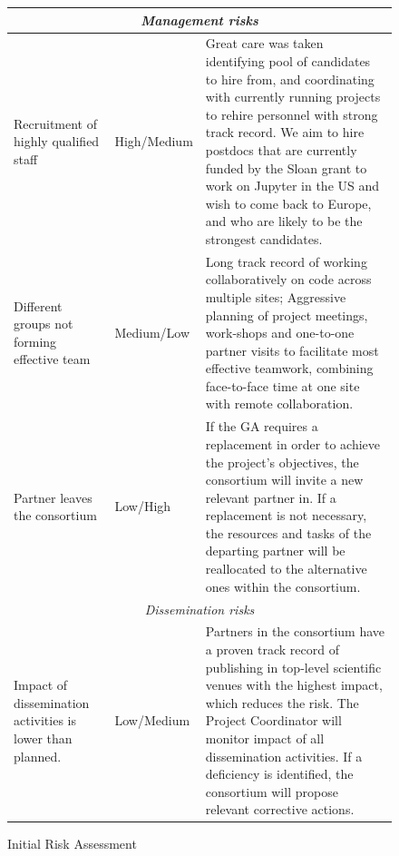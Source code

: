 \begin{figure}
\begin{center}
\begin{tabular}{|m{}|m{}|m{}|}
  \multicolumn{3}{|c|}{
    \textit{Management risks}
  }
  \\\hline

  Recruitment of highly qualified staff & High/Medium &
  Great care was taken identifying pool of candidates to hire from,
  and coordinating with currently running projects to rehire personnel
  with strong track record. We aim to hire
  postdocs that are currently funded by the Sloan grant to work on
  Jupyter in the US and wish to come back to Europe, and who are
  likely to be the strongest candidates.\\\hline

  Different groups not forming effective team & Medium/Low & Long
  track record of working collaboratively on code across multiple
  sites; Aggressive planning of project meetings, work-shops and
  one-to-one partner visits to facilitate most effective teamwork,
  combining face-to-face time at one site with remote
  collaboration.\\\hline

  Partner leaves the consortium & Low/High & If the GA requires a replacement
  in order to achieve the project's objectives, the consortium will invite a new
  relevant partner in. If a replacement is not necessary, the resources and tasks
  of the departing partner will be reallocated to the alternative ones within the
  consortium.
  \\\hline

  \multicolumn{3}{|c|}{
    \textit{Dissemination risks}
  }
  \\\hline

  Impact of dissemination activities is lower than planned. & Low/Medium &
  Partners in the consortium have a proven track record of publishing in top-level
  scientific venues with the highest impact, which reduces the risk. The Project Coordinator
  will monitor impact of all dissemination activities. If a deficiency is identified, the consortium
  will propose relevant corrective actions.\\\hline

  \end{tabular}
\end{center}
\caption{\label{risk-table}Initial Risk Assessment}
\end{figure}
\fi




